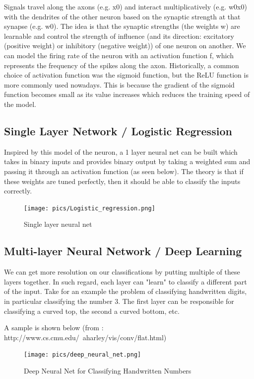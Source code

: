 \documentclass[twoside]{article}
\begin{document}
Signals travel along the axons (e.g. x0) and interact multiplicatively (e.g. w0x0) with the dendrites of the other neuron based on the synaptic strength at that synapse (e.g. w0). The idea is that the synaptic strengths (the weights w) are learnable and control the strength of influence (and its direction: excitatory (positive weight) or inhibitory (negative weight)) of one neuron on another. We can model the firing rate of the neuron with an activation function f, which represents the frequency of the spikes along the axon. Historically, a common choice of activation function was the sigmoid function, but the ReLU function is more commonly used nowadays. This is because the gradient of the sigmoid function becomes small as its value increases which reduces the training speed of the model.


\subsection{Single Layer Network / Logistic Regression}
Inspired by this model of the neuron, a 1 layer neural net can be built which takes in binary inputs and provides binary output by taking a weighted sum and passing it through an activation function (as seen below). The theory is that if these weights are tuned perfectly, then it should be able to classify the inputs correctly.


\begin{figure}[!htb]
\centering
\texttt{[image: pics/Logistic\_regression.png]}
\caption{Single layer neural net\cite{Lecture slides}}
\label{fig:Single layer neural net}
\end{figure}


\subsection{Multi-layer Neural Network / Deep Learning}

We can get more resolution on our classifications by putting multiple of these layers together. In such regard, each layer can "learn" to classify a different part of the input. Take for an example the problem of classifying handwritten digits, in particular classifying the number 3. The first layer can be responsible for classifying a curved top, the second a curved bottom, etc.

A sample is shown below (from : http://www.cs.cmu.edu/~aharley/vis/conv/flat.html)

\begin{figure}[!htb]
\centering
\texttt{[image: pics/deep\_neural\_net.png]}
\caption{Deep Neural Net for Classifying Handwritten Numbers\cite{}}
\label{fig:Single layer neural net}
\end{figure}
\end{document}
